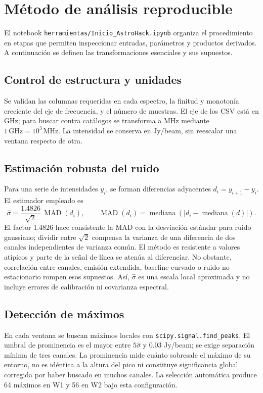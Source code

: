 \documentclass[10pt]{article}
\begin{document}
\section{Método de análisis reproducible}
El notebook \texttt{herramientas/Inicio\_AstroHack.ipynb} organiza el procedimiento en etapas que permiten inspeccionar entradas, parámetros y productos derivados. A continuación se definen las transformaciones esenciales y sus supuestos.

\subsection{Control de estructura y unidades}
Se validan las columnas requeridas en cada espectro, la finitud y monotonía creciente del eje de frecuencia, y el número de muestras. El eje de los CSV está en GHz; para buscar contra catálogos se transforma a MHz mediante $1\,\mathrm{GHz}=10^3\,\mathrm{MHz}$. La intensidad se conserva en Jy/beam, sin reescalar una ventana respecto de otra.

\subsection{Estimación robusta del ruido}
Para una serie de intensidades $y_i$, se forman diferencias adyacentes $d_i=y_{i+1}-y_i$. El estimador empleado es
\begin{equation}
\widehat{\sigma}=\frac{1.4826}{\sqrt{2}}\,\operatorname{MAD}(d_i),\qquad
\operatorname{MAD}(d_i)=\operatorname{mediana}\left(\left|d_i-\operatorname{mediana}(d)\right|\right).
\end{equation}
El factor 1.4826 hace consistente la MAD con la desviación estándar para ruido gaussiano; dividir entre $\sqrt{2}$ compensa la varianza de una diferencia de dos canales independientes de varianza común. El método es resistente a valores atípicos y parte de la señal de línea se atenúa al diferenciar. No obstante, correlación entre canales, emisión extendida, baseline curvado o ruido no estacionario rompen esos supuestos. Así, $\widehat{\sigma}$ es una escala local aproximada y no incluye errores de calibración ni covarianza espectral.

\subsection{Detección de máximos}
En cada ventana se buscan máximos locales con \texttt{scipy.signal.find\_peaks}. El umbral de prominencia es el mayor entre $5\widehat{\sigma}$ y 0.03 Jy/beam; se exige separación mínima de tres canales. La prominencia mide cuánto sobresale el máximo de su entorno, no es idéntica a la altura del pico ni constituye significancia global corregida por haber buscado en muchos canales. La selección automática produce 64 máximos en W1 y 56 en W2 bajo esta configuración.
\end{document}
